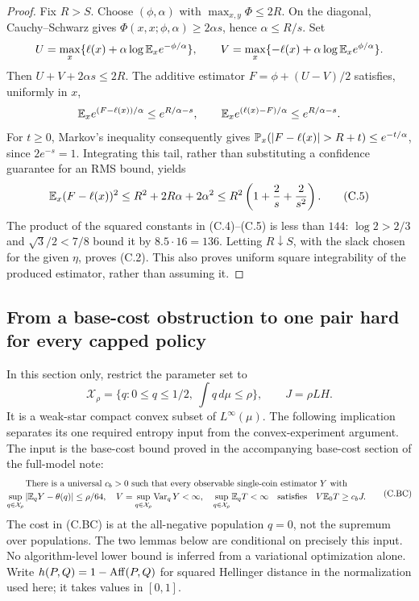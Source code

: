 \begin{proof}
Fix $R>S$. Choose $(\phi,\alpha)$ with
$\max_{x,y}\Phi\le2R$. On the diagonal, Cauchy--Schwarz gives
$\Phi(x,x;\phi,\alpha)\ge2\alpha s$, hence $\alpha\le R/s$.
Set
\[
 U=\max_x\{\ell(x)+\alpha\log\mathbb E_xe^{-\phi/\alpha}\},\qquad
 V=\max_x\{-\ell(x)+\alpha\log\mathbb E_xe^{\phi/\alpha}\}.
\]
Then $U+V+2\alpha s\le2R$. The additive estimator
$F=\phi+(U-V)/2$ satisfies, uniformly in $x$,
\[
 \mathbb E_x e^{(F-\ell(x))/\alpha}\le e^{R/\alpha-s},\qquad
 \mathbb E_x e^{(\ell(x)-F)/\alpha}\le e^{R/\alpha-s}.
\]
For $t\ge0$, Markov's inequality consequently gives
$\Pp_x(|F-\ell(x)|>R+t)\le e^{-t/\alpha}$, since $2e^{-s}=1$.
Integrating this tail, rather than substituting a confidence guarantee
for an RMS bound, yields
\[
 \mathbb E_x(F-\ell(x))^2
 \le R^2+2R\alpha+2\alpha^2
 \le R^2\left(1+\frac2s+\frac2{s^2}\right).                \tag{C.5}
\]
The product of the squared constants in (C.4)--(C.5) is less than $144$:
$\log2>2/3$ and $\sqrt3/2<7/8$ bound it by $8.5\cdot16=136$.
Letting $R\downarrow S$, with the slack chosen for the given $\eta$,
proves (C.2). This also proves uniform square integrability of the produced
estimator, rather than assuming it.
\end{proof}

\subsection{From a base-cost obstruction to one pair hard for every capped policy}
In this section only, restrict the parameter set to
\[
 \mathcal X_\rho=\{q:0\le q\le1/2,\ \int q\,d\mu\le\rho\},
 \qquad J=\rho L H.
\]
It is a weak-star compact convex subset of $L^\infty(\mu)$.
The following implication separates its one required entropy input from
the convex-experiment argument. The input is the base-cost bound proved in
the accompanying base-cost section of the full-model note:
\begin{equation}\label{crit:eq:base-cost-input}
 \begin{gathered}
 \text{There is a universal }c_b>0\text{ such that every observable
 single-coin estimator }Y\text{ with}\\
 \sup_{q\in\mathcal X_\rho}|\mathbb E_qY-\theta(q)|\le\rho/64,
 \quad V=\sup_{q\in\mathcal X_\rho}\operatorname{Var}_qY<\infty,
 \quad \sup_{q\in\mathcal X_\rho}\mathbb E_qT<\infty
 \quad\text{satisfies}\quad V\mathbb E_0T\ge c_bJ.
 \end{gathered}                                                     \tag{C.BC}
\end{equation}
The cost in (C.BC) is at the all-negative population $q=0$, not the supremum
over populations. The two lemmas below are conditional on precisely this
input. No algorithm-level lower bound is inferred from a variational
optimization alone. Write
$h(P,Q)=1-\operatorname{Aff}(P,Q)$ for squared Hellinger distance in the normalization
used here; it takes values in $[0,1]$.


